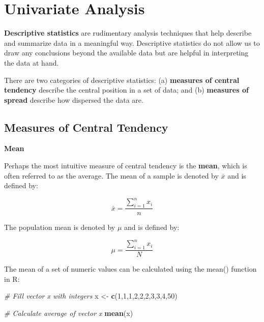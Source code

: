 \documentclass[]{book}
\newenvironment{Shaded}{\begin{snugshade}}{\end{snugshade}}
\newcommand{\CommentTok}[1]{\textcolor[rgb]{0.56,0.35,0.01}{\textit{#1}}}
\newcommand{\DecValTok}[1]{\textcolor[rgb]{0.00,0.00,0.81}{#1}}
\newcommand{\KeywordTok}[1]{\textcolor[rgb]{0.13,0.29,0.53}{\textbf{#1}}}
\newcommand{\NormalTok}[1]{#1}
\newcommand{\StringTok}[1]{\textcolor[rgb]{0.31,0.60,0.02}{#1}}
\begin{document}
\hypertarget{univariate-analysis}{%
\section{Univariate Analysis}\label{univariate-analysis}}

\textbf{Descriptive statistics} are rudimentary analysis techniques that help describe and summarize data in a meaningful way. Descriptive statistics do not allow us to draw any conclusions beyond the available data but are helpful in interpreting the data at hand.

There are two categories of descriptive statistics: (a) \textbf{measures of central tendency} describe the central position in a set of data; and (b) \textbf{measures of spread} describe how dispersed the data are.

\hypertarget{measures-of-central-tendency}{%
\subsection{Measures of Central Tendency}\label{measures-of-central-tendency}}

\textbf{Mean}

Perhaps the most intuitive measure of central tendency is the \textbf{mean}, which is often referred to as the average. The mean of a sample is denoted by \(\bar{x}\) and is defined by:

\[ \bar{x} = \frac{\displaystyle\sum_{i=1}^{n} x_{i}}{n} \]

The population mean is denoted by \(\mu\) and is defined by:

\[ \mu = \frac{\displaystyle\sum_{i=1}^{n} x_{i}}{N} \]

The mean of a set of numeric values can be calculated using the mean() function in R:

\begin{Shaded}
\begin{Highlighting}[]
\CommentTok{# Fill vector x with integers}
\NormalTok{x <-}\StringTok{ }\KeywordTok{c}\NormalTok{(}\DecValTok{1}\NormalTok{,}\DecValTok{1}\NormalTok{,}\DecValTok{1}\NormalTok{,}\DecValTok{2}\NormalTok{,}\DecValTok{2}\NormalTok{,}\DecValTok{2}\NormalTok{,}\DecValTok{3}\NormalTok{,}\DecValTok{3}\NormalTok{,}\DecValTok{4}\NormalTok{,}\DecValTok{50}\NormalTok{)}

\CommentTok{# Calculate average of vector x}
\KeywordTok{mean}\NormalTok{(x)}
\end{Highlighting}
\end{Shaded}
\end{document}
